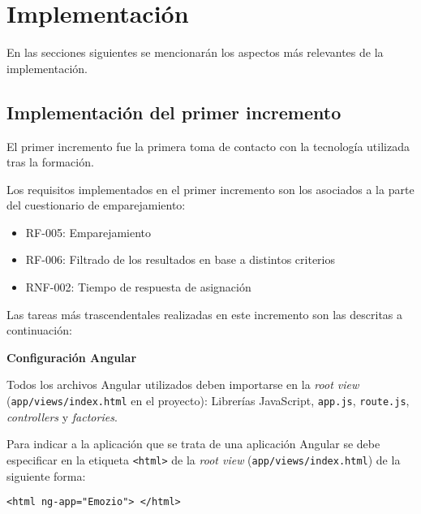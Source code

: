 \chapter{Implementación}

En las secciones siguientes se mencionarán los aspectos más relevantes de la implementación.\newline

\section{Implementación del primer incremento}
El primer incremento fue la primera toma de contacto con la tecnología utilizada tras la formación.\newline



Los requisitos implementados en el primer incremento son los asociados a la parte del cuestionario de emparejamiento:



\begin{itemize}
\item RF-005: Emparejamiento 
\item RF-006: Filtrado de los resultados en base a distintos criterios
\item RNF-002: Tiempo de respuesta de asignación
\end{itemize}



Las tareas más trascendentales realizadas en este incremento son las descritas a continuación:\newline


 
\textbf{Configuración Angular} 


Todos los archivos Angular utilizados deben importarse en la \textit{root view} \\ (\texttt{app/views/index.html} en el proyecto): Librerías JavaScript, \texttt{app.js}, \texttt{route.js}, \textit{controllers} y \textit{factories}.\newline



Para indicar a la aplicación que se trata de una aplicación Angular se debe especificar en la etiqueta \texttt{<html>} de la \textit{root view} (\texttt{app/views/index.html}) de la siguiente forma:



\medskip
\begin{lstlisting}
<html ng-app="Emozio"> </html>
\end{lstlisting}



